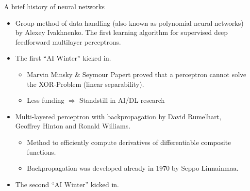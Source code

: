 \begin{vbframe}{A brief history of neural networks}
\begin{itemize}
    \begin{itemize}
      \item Weights are now adjusted according to the weighted sum of the inputs.
    \end{itemize}
    \item {} Group method of data handling (also known as polynomial neural networks) by Alexey Ivakhnenko. The first learning algorithm for supervised deep feedforward multilayer perceptrons.
    \item {} The first \enquote{AI Winter} kicked in.
    \begin{itemize}
      \item Marvin Minsky \& Seymour Papert proved that a perceptron cannot solve the XOR-Problem (linear separability).
      \item Less funding $\Rightarrow$ Standstill in AI/DL research
    \end{itemize}
  \end{itemize}
\framebreak
  \begin{itemize}
    \item {} Multi-layered perceptron with backpropagation by David Rumelhart, Geoffrey Hinton and Ronald Williams.
    \begin{itemize}
      \item Method to efficiently compute derivatives of differentiable composite functions.
      \item Backpropagation was developed already in 1970 by Seppo Linnainmaa.
    \end{itemize}
    \item {} The second \enquote{AI Winter} kicked in.

\end{itemize}
\end{vbframe}
